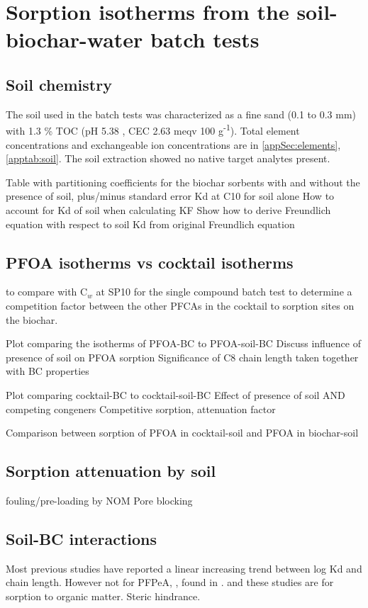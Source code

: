 \section{Sorption isotherms from the soil-biochar-water batch tests}
\subsection{Soil chemistry}
The soil used in the batch tests was characterized as a fine sand (0.1 to 0.3 mm) with 1.3 \% TOC (pH 5.38 , CEC 2.63  meqv 100 g\textsuperscript{-1}). Total element concentrations and exchangeable ion concentrations are in \cref{appSec:elements}, \cref{apptab:soil}. The soil extraction showed no native target analytes present.  

Table with partitioning coefficients for the biochar sorbents with and without the presence of soil, plus/minus standard error
Kd at C10 for soil alone
How to account for Kd of soil when calculating KF 
    Show how to derive Freundlich equation with respect to soil Kd from original Freundlich equation
    
\subsection{PFOA isotherms vs cocktail isotherms}
to compare with C$_w$ at SP10 for the single compound batch test to determine a competition factor between the other PFCAs in the cocktail to sorption sites on the biochar.

Plot comparing the isotherms of PFOA-BC to PFOA-soil-BC
Discuss influence of presence of soil on PFOA sorption
Significance of C8 chain length taken together with BC properties 

Plot comparing cocktail-BC to cocktail-soil-BC
Effect of presence of soil AND competing congeners
Competitive sorption, attenuation factor

Comparison between sorption of PFOA in cocktail-soil and PFOA in biochar-soil

\subsection{Sorption attenuation by soil}
fouling/pre-loading by NOM
Pore blocking

\subsection{Soil-BC interactions}
Most previous studies have reported a linear increasing trend between log Kd and chain length. However not for PFPeA, \citep{zhang2013sorption}, found in \citep{Sorengard2019}. and \citep{guelfo2013}  these studies are for sorption to organic matter.  Steric hindrance. 

